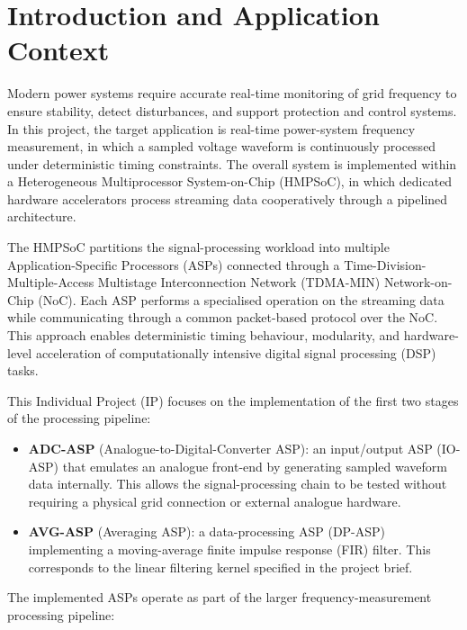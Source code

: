 \documentclass[10pt, a4paper]{article}
\begin{document}

\section{Introduction and Application Context}

Modern power systems require accurate real-time monitoring of grid frequency to ensure stability, detect disturbances, and support protection and control systems. In this project, the target application is real-time power-system frequency measurement, in which a sampled voltage waveform is continuously processed under deterministic timing constraints. The overall system is implemented within a Heterogeneous Multiprocessor System-on-Chip (HMPSoC), in which dedicated hardware accelerators process streaming data cooperatively through a pipelined architecture.

The HMPSoC partitions the signal-processing workload into multiple Application-Specific Processors (ASPs) connected through a Time-Division-Multiple-Access Multistage Interconnection Network (TDMA-MIN) Network-on-Chip (NoC). Each ASP performs a specialised operation on the streaming data while communicating through a common packet-based protocol over the NoC. This approach enables deterministic timing behaviour, modularity, and hardware-level acceleration of computationally intensive digital signal processing (DSP) tasks.

This Individual Project (IP) focuses on the implementation of the first two stages of the processing pipeline:

\begin{itemize}
    \item \textbf{ADC-ASP} (Analogue-to-Digital-Converter ASP): an input/output ASP (IO-ASP) that emulates an analogue front-end by generating sampled waveform data internally. This allows the signal-processing chain to be tested without requiring a physical grid connection or external analogue hardware.
    \item \textbf{AVG-ASP} (Averaging ASP): a data-processing ASP (DP-ASP) implementing a moving-average finite impulse response (FIR) filter. This corresponds to the linear filtering kernel specified in the project brief.
\end{itemize}

The implemented ASPs operate as part of the larger frequency-measurement processing pipeline:
\end{document}
